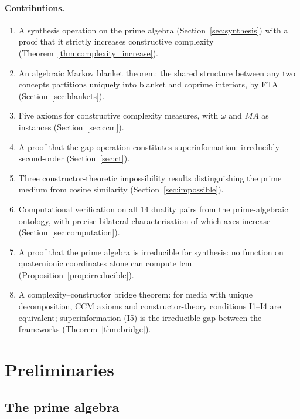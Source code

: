 \documentclass[11pt,a4paper]{article}
\begin{document}
\paragraph{Contributions.}
\begin{enumerate}[nosep]
\item A synthesis operation on the prime algebra
  (Section~\ref{sec:synthesis}) with a proof that it strictly
  increases constructive complexity
  (Theorem~\ref{thm:complexity_increase}).
\item An algebraic Markov blanket theorem: the shared structure
  between any two concepts partitions uniquely into blanket and
  coprime interiors, by FTA
  (Section~\ref{sec:blankets}).
\item Five axioms for constructive complexity measures, with
  $\omega$ and $MA$ as instances
  (Section~\ref{sec:ccm}).
\item A proof that the gap operation constitutes
  superinformation: irreducibly second-order
  (Section~\ref{sec:ct}).
\item Three constructor-theoretic impossibility results
  distinguishing the prime medium from cosine similarity
  (Section~\ref{sec:impossible}).
\item Computational verification on all 14 duality pairs from
  the prime-algebraic ontology, with precise bilateral
  characterisation of which axes increase
  (Section~\ref{sec:computation}).
\item A proof that the prime algebra is irreducible for
  synthesis: no function on quaternionic coordinates alone can
  compute $\mathrm{lcm}$
  (Proposition~\ref{prop:irreducible}).
\item A complexity--constructor bridge theorem: for media with
  unique decomposition, CCM axioms and constructor-theory
  conditions I1--I4 are equivalent; superinformation (I5) is
  the irreducible gap between the frameworks
  (Theorem~\ref{thm:bridge}).
\end{enumerate}

\section{Preliminaries}
\label{sec:prelim}

\subsection{The prime algebra}
\end{document}
